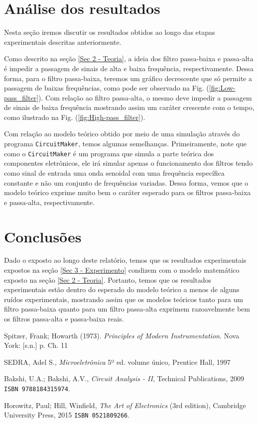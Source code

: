 \documentclass[letterpaper, 12pt]{article}
\begin{document}
\section{Análise dos resultados}\label{Sec 4 - Resultados}
Nesta seção iremos discutir os resultados obtidos ao longo das etapas experimentais descritas anteriormente.

Como descrito na seção \ref{Sec 2 - Teoria}, a ideia dos filtro passa-baixa e passa-alta é impedir a passagem de sinais de alta e baixa frequência, respectivamente. Dessa forma, para o filtro passa-baixa, teremos um gráfico decrescente que só permite a passagem de baixas frequências, como pode ser observado na Fig. (\ref{fig:Low-pass_filter}). Com relação ao filtro passa-alta, o mesmo deve impedir a passagem de sinais de baixa frequência mostrando assim um caráter crescente com o tempo, como ilustrado na Fig. (\ref{fig:High-pass_filter}). 


Com relação ao modelo teórico obtido por meio de uma simulação através do programa \texttt{CircuitMaker}, temos algumas semelhanças. Primeiramente, note que como o \texttt{CircuitMaker} é um programa que simula a parte teórica dos componentes eletrônicos, ele irá simular apenas o funcionamento dos filtros tendo como sinal de entrada uma onda senoidal com uma frequência específica constante e não um conjunto de frequências variadas. Dessa forma, vemos que o modelo teórico exprime muito bem o caráter esperado para os filtros passa-baixa e passa-alta, respectivamente.



\section{Conclusões}\label{Sec 5 - Conclusão}
Dado o exposto ao longo deste relatório, temos que os resultados experimentais expostos na seção \ref{Sec 3 - Experimento} condizem com o modelo matemático exposto na seção \ref{Sec 2 - Teoria}. Portanto, temos que os resultados experimentais estão dentro do esperado do modelo teórico a menos de alguns ruídos experimentais, mostrando assim que os modelos teóricos tanto para um filtro passa-baixa quanto para um filtro passa-alta exprimem razoavelmente bem os filtros passa-alta e passa-baixa reais.



\begin{thebibliography}{100}

Spitzer, Frank; Howarth (1973). \textit{Principles of Modern Instrumentation}. Nova York: [s.n.] p. Ch. 11

SEDRA, Adel S., \textit{Microeletrônica} 5º ed. volume único, Prentice Hall, 1997

Bakshi, U.A.; Bakshi, A.V., \textit{Circuit Analysis - II}, Technical Publications, 2009 \texttt{ISBN 9788184315974}.

Horowitz, Paul; Hill, Winfield, \textit{The Art of Electronics} (3rd edition), Cambridge University Press, 2015 \texttt{ISBN 0521809266}.

\end{thebibliography}
\end{document}

